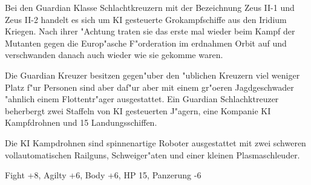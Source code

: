 Bei den Guardian Klasse Schlachtkreuzern mit der Bezeichnung Zeus II-1 und Zeus II-2 handelt es sich um KI gesteuerte Gro\3kampfschiffe aus den Iridium Kriegen. Nach ihrer "Achtung traten sie das erste mal wieder beim Kampf der Mutanten gegen die Europ"asche F"orderation im erdnahmen Orbit auf und verschwanden danach auch wieder wie sie gekomme waren.

Die Guardian Kreuzer besitzen gegen"uber den "ublichen Kreuzern viel weniger Platz f"ur Personen sind aber daf"ur aber mit einem gr"o\3eren Jagdgeschwader "ahnlich einem Flottentr"ager ausgestattet. Ein Guardian Schlachktreuzer beherbergt zwei Staffeln von KI gesteuerten J"agern, eine Kompanie KI Kampfdrohnen und 15 Landungsschiffen.

Die KI Kampdrohnen sind spinnenartige Roboter ausgestattet mit zwei schweren vollautomatischen Railguns, Schwei\3ger"aten und einer kleinen Plasmaschleuder.

Fight +8, Agilty +6, Body +6, HP 15, Panzerung -6

